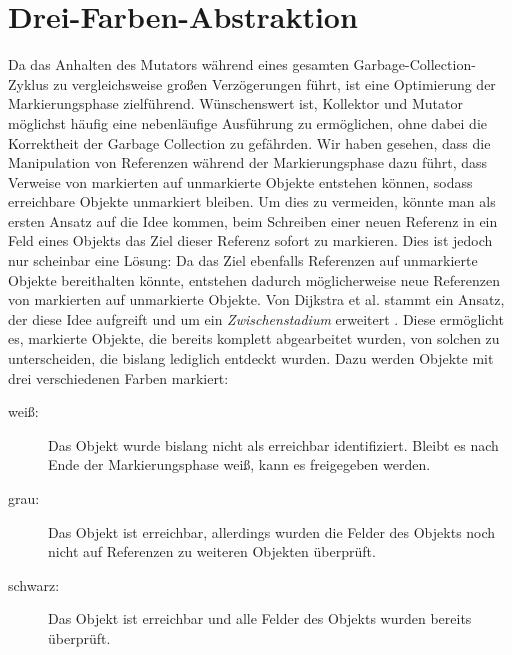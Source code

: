 
\section{Drei-Farben-Abstraktion}
\label{sec:tricolor}
Da das Anhalten des Mutators während eines gesamten Garbage-Collection-Zyklus zu vergleichsweise großen Verzögerungen führt, ist eine Optimierung der Markierungsphase zielführend.
Wünschenswert ist, Kollektor und Mutator möglichst häufig eine nebenläufige Ausführung zu ermöglichen, ohne dabei die Korrektheit der Garbage Collection zu gefährden.
Wir haben gesehen, dass die Manipulation von Referenzen während der Markierungsphase dazu führt, dass Verweise von markierten auf unmarkierte Objekte entstehen können, sodass erreichbare Objekte unmarkiert bleiben.
Um dies zu vermeiden, könnte man als ersten Ansatz auf die Idee kommen, beim Schreiben einer neuen Referenz in ein Feld eines Objekts das Ziel dieser Referenz sofort zu markieren.
Dies ist jedoch nur scheinbar eine Lösung:
Da das Ziel ebenfalls Referenzen auf unmarkierte Objekte bereithalten könnte, entstehen dadurch möglicherweise neue Referenzen von markierten auf unmarkierte Objekte.
Von Dijkstra et al. stammt ein Ansatz, der diese Idee aufgreift und um ein \textit{Zwischenstadium} erweitert \cite[S. 969f]{dijkstra1978}.
Diese ermöglicht es, markierte Objekte, die bereits komplett abgearbeitet wurden, von solchen zu unterscheiden, die bislang lediglich entdeckt wurden.
Dazu werden Objekte mit drei verschiedenen Farben markiert:

\begin{description}
	\item[weiß:] Das Objekt wurde bislang nicht als erreichbar identifiziert.
		Bleibt es nach Ende der Markierungsphase weiß, kann es freigegeben werden.
	\item[grau:] Das Objekt ist erreichbar, allerdings wurden die Felder des Objekts noch nicht auf Referenzen zu weiteren Objekten überprüft.
	\item[schwarz:] Das Objekt ist erreichbar und alle Felder des Objekts wurden bereits überprüft.
\end{description}

